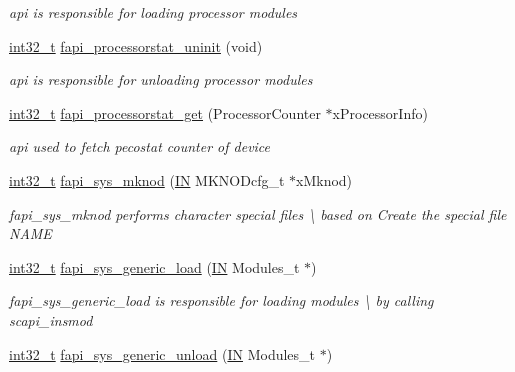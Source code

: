 \begin{DoxyCompactItemize}
\begin{DoxyCompactList}\small\item\em api is responsible for loading processor modules \end{DoxyCompactList}\item 
\hyperlink{commondefs_8h_a32f2e37ee053cf2ce8ca28d1f74630e5}{int32\-\_\-t} \hyperlink{group__FAPI__SYSTEM_gaf4da56440936e9a19588329c01cb0ff0}{fapi\-\_\-processorstat\-\_\-uninit} (void)
\begin{DoxyCompactList}\small\item\em api is responsible for unloading processor modules \end{DoxyCompactList}\item 
\hyperlink{commondefs_8h_a32f2e37ee053cf2ce8ca28d1f74630e5}{int32\-\_\-t} \hyperlink{group__FAPI__SYSTEM_ga83648276182cb297517ff914e586a200}{fapi\-\_\-processorstat\-\_\-get} (Processor\-Counter $\ast$x\-Processor\-Info)
\begin{DoxyCompactList}\small\item\em api used to fetch pecostat counter of device \end{DoxyCompactList}\item 
\hyperlink{commondefs_8h_a32f2e37ee053cf2ce8ca28d1f74630e5}{int32\-\_\-t} \hyperlink{group__FAPI__SYSTEM_ga700881060be85810ad288d1d3a262245}{fapi\-\_\-sys\-\_\-mknod} (\hyperlink{group__LIBHELP_gac2bbd6d630a06a980d9a92ddb9a49928}{I\-N} M\-K\-N\-O\-Dcfg\-\_\-t $\ast$x\-Mknod)
\begin{DoxyCompactList}\small\item\em fapi\-\_\-sys\-\_\-mknod performs character special files \textbackslash{} based on Create the special file N\-A\-M\-E \end{DoxyCompactList}\item 
\hyperlink{commondefs_8h_a32f2e37ee053cf2ce8ca28d1f74630e5}{int32\-\_\-t} \hyperlink{group__FAPI__SYSTEM_ga93ede7c753dabdeb933f60e7a0a0f2b0}{fapi\-\_\-sys\-\_\-generic\-\_\-load} (\hyperlink{group__LIBHELP_gac2bbd6d630a06a980d9a92ddb9a49928}{I\-N} Modules\-\_\-t $\ast$)
\begin{DoxyCompactList}\small\item\em fapi\-\_\-sys\-\_\-generic\-\_\-load is responsible for loading modules \textbackslash{} by calling scapi\-\_\-insmod \end{DoxyCompactList}\item 
\hyperlink{commondefs_8h_a32f2e37ee053cf2ce8ca28d1f74630e5}{int32\-\_\-t} \hyperlink{group__FAPI__SYSTEM_gabcc681d891ee167bdb74b0e5430956ab}{fapi\-\_\-sys\-\_\-generic\-\_\-unload} (\hyperlink{group__LIBHELP_gac2bbd6d630a06a980d9a92ddb9a49928}{I\-N} Modules\-\_\-t $\ast$)

\end{DoxyCompactItemize}
